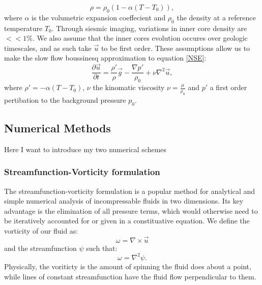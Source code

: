 \documentclass{article}
\begin{document}
\begin{equation}
	\rho = \rho_0 (1- \alpha(T -T_0)),
	\label{equation of state}
\end{equation}
where $\alpha$ is the volumetric expansion coeffecient and $\rho_0$ the density at a reference temperature $T_0$.
Through siesmic imaging, variations in inner core density are $<< 1 \%$. We also assume that the inner cores evolution occures over geologic timescales, and as such take $\vec{u}$ to be first order. These assumptions allow us to make the slow flow boussinesq approximation to equation \ref{NSE}:
\begin{equation}
	\frac{\partial \vec{u}}{\partial t} = \frac{\rho'}{\rho} \vec{g} -   \frac{\nabla p'}{\rho_0} + \nu \nabla^2 \vec{u},
	\label{NSE slow + boussinesq}
\end{equation}
where $\rho'=-\alpha(T - T_0)$, $\nu$ the kinomatic viscosity $\nu = \frac{\mu}{\rho_0}$ and $p'$ a first order pertibation to the background pressure $p_0$.











\subsection*{Numerical Methods}
Here I want to introduce my two numerical schemes

\subsubsection*{Streamfunction-Vorticity formulation}
The streamfunction-vorticity formulation is a popular method for analytical and simple numerical analysis of incompressable fluids in two dimensions. Its key advantage is the elimination of all pressure terms, which would otherwise need to be iteratively accounted for or given in a constituative equation. We define the vorticity of our fluid as:
\begin{equation}
	\omega = \nabla \times \vec{u}
\end{equation}
and the streamfunction $\psi$ such that:
\begin{equation}
	\omega = \nabla^2 \psi.
\end{equation}
Physically, the voriticty is the amount of spinning the fluid does about a point, while lines of constant streamfunction have the fluid flow perpendicular to them. 
\end{document}
